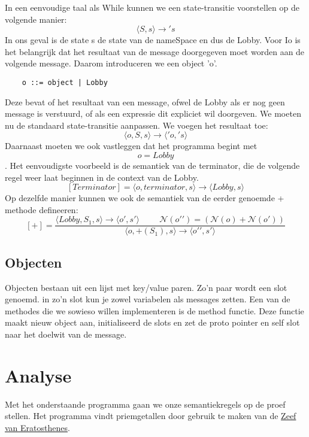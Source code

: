 \documentclass[12pt]{article}
\begin{document}
In een eenvoudige taal als While kunnen we een state-transitie voorstellen op de volgende manier:
\[\langle S,s \rangle \rightarrow \prime s\]
In ons geval is de state s de state van de nameSpace en dus de Lobby.
Voor Io is het belangrijk dat het resultaat van de message doorgegeven moet worden aan de volgende message. Daarom introduceren we een object 'o'.
\begin{lstlisting}
	o ::= object | Lobby
\end{lstlisting}
Deze bevat of het resultaat van een message, ofwel de Lobby als er nog geen message is verstuurd, of als een expressie dit expliciet wil doorgeven. We moeten nu de standaard state-transitie aanpassen. We voegen het resultaat toe:
\[\langle o,S,s \rangle \rightarrow \langle \prime o,\prime s \rangle\]
Daarnaast moeten we ook vastleggen dat het programma begint met \[o = Lobby\].
Het eenvoudigste voorbeeld is de semantiek van de terminator, die de volgende regel weer laat beginnen in de context van de Lobby.
\[[Terminator] = \langle o, terminator, s\rangle \rightarrow \langle Lobby, s\rangle\]
Op dezelfde manier kunnen we ook de semantiek van de eerder genoemde + methode defineeren:
\[[+] = 
\frac{
	\langle Lobby, S_1, s \rangle \rightarrow \langle o\prime, s\prime \rangle \hspace{1cm}
	\mathcal{N}(o\prime\prime) = (\mathcal{N}(o) + \mathcal{N}(o\prime))
	}{ \langle o, +(S_1), s \rangle \rightarrow \langle o\prime\prime,s\prime \rangle}
 \]

\subsection{Objecten}
Objecten bestaan uit een lijst met key/value paren. Zo'n paar wordt een slot genoemd.
in zo'n slot kun je zowel variabelen als messages zetten.
Een van de methodes die we sowieso willen implementeren is de method functie. 
Deze functie maakt nieuw object aan, initialiseerd de slots en zet de proto pointer en self slot naar het doelwit van de message. 

\section{Analyse}
Met het onderstaande programma gaan we onze semantiekregels op de proef stellen.
Het programma vindt priemgetallen door gebruik te maken van de \href{https://nl.wikipedia.org/wiki/Zeef_van_Eratosthenes}{Zeef van Eratosthenes}.
\end{document}
